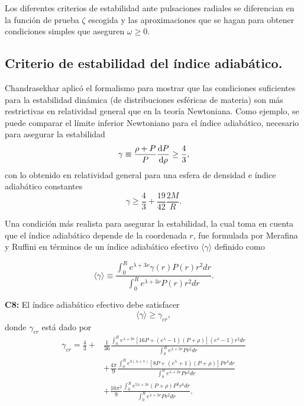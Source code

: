 Los diferentes criterios de estabilidad ante pulsaciones radiales se diferencian en la función de prueba $\zeta$ escogida y las aproximaciones que se hagan para obtener condiciones simples que aseguren $\omega \geq 0$.


\subsection*{Criterio de estabilidad del índice adiabático.}

\noindent Chandrasekhar aplicó el formalismo para mostrar que las condiciones suficientes para la estabilidad dinámica (de distribuciones esféricas de materia) son más restrictivas en relatividad general que en la teoría Newtoniana. Como ejemplo, se puede comparar el límite inferior Newtoniano para el índice adiabático, necesario para asegurar la  estabilidad
\begin{equation}
    \gamma \equiv \frac { \rho + P  } { P } \dv{P}{\rho} \geq \frac{4}{3},
\end{equation}
con lo obtenido en relatividad general para una esfera de densidad e índice adiabático constantes
\begin{equation}
    \gamma \geq \frac{4}{3} +  \frac{19}{42} \frac{2M}{R}.
\end{equation}

Una condición más realista para asegurar la estabilidad, la cual toma en cuenta que el índice adiabático depende de la coordenada $r$, fue formulada por Merafina y Ruffini \cite{Merafina1989} en términos de un índice adiabático efectivo $\langle\gamma\rangle$ definido como

\begin{equation}
    \langle\gamma\rangle\equiv\frac{\int_{0}^{R} e^{\lambda+3 \nu} \gamma(r) P(r) r^{2} d r}{\int_{0}^{R} e^{\lambda+3 \nu} P(r) r^{2} d r}.
\end{equation}

\textbf{C8:} El índice adiabático efectivo debe satisfacer
\begin{equation}
     \langle\gamma\rangle \geq \gamma_{cr},
\end{equation}
donde $\gamma_{cr}$ está dado por
\begin{align}\label{gammacrit}
    \gamma_{cr} = \frac{4}{3} +& \frac{1}{36} \frac{\int_{0}^{R} e^{\lambda+3 \mathrm{v}}\left[16 P+\left(e^{\lambda}-1\right)\left(P+\rho \right)\right]\left(e^{\lambda}-1\right) r^{2} d r}{\int_{0}^{R} e^{\lambda+3 \mathrm{v}} P r^{2} d r} \nonumber
    \\ &+ \frac{4 \pi}{9} \frac{\int_{0}^{R} e^{3( \lambda+ \mathrm{v})}\left[8 P+\left(e^{\lambda}+1\right)\left(P+\rho \right)\right] P r^{4} d r}{\int_{0}^{R} e^{\lambda+3 \mathrm{v}} P r^{2} d r}
    \\ & + \frac{16 \pi^{2} }{9} \frac{\int_{0}^{R} e^{5 \lambda+3 v }\left(P+\rho \right) P^{2} r^{6} d r}{\int_{0}^{R} e^{\lambda+3 v } P r^{2} d r}. \nonumber
\end{align}

